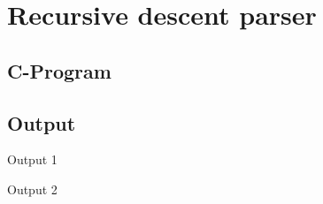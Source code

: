 \section{Recursive descent parser}
\subsection{C-Program}



\subsection{Output}
Output 1


Output 2
